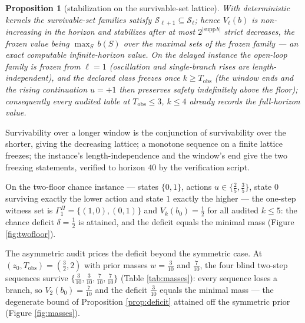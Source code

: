\documentclass[10pt,twocolumn]{article}
\theoremstyle{plain}
\newtheorem{proposition}[theorem]{Proposition}
\theoremstyle{definition}
\theoremstyle{remark}
\begin{document}
\begin{proposition}[stabilization on the survivable-set lattice]\label{prop:freeze}
With deterministic kernels the survivable-set families satisfy
\(\mathcal{S}_{\ell+1} \subseteq \mathcal{S}_{\ell}\); hence
\(V_{\ell}(b)\) is non-increasing in the horizon and stabilizes after
at most \(2^{|\mathrm{supp}\, b|}\) strict decreases, the frozen value
being \(\max_{S}\, b(S)\) over the maximal sets of the frozen family
--- an exact computable infinite-horizon value. On the delayed instance
the open-loop family is frozen from \(\ell = 1\) (oscillation and
single-branch rises are length-independent), and the declared class
freezes once \(k \ge T_{\mathrm{obs}}\) (the window ends and the
rising continuation \(u = +1\) then preserves safety indefinitely
above the floor); consequently every audited table at
\(T_{\mathrm{obs}} \le 3\), \(k \le 4\) already records the
full-horizon value.
\end{proposition}

Survivability over a longer window is the conjunction of survivability
over the shorter, giving the decreasing lattice; a monotone sequence on a
finite lattice freezes; the instance's length-independence and the
window's end give the two freezing statements, verified to horizon
\(40\) by the verification script.

On the two-floor chance instance --- states \(\{0, 1\}\), actions
\(u \in \{\tfrac{2}{5}, \tfrac{3}{5}\}\), state \(0\) surviving exactly
the lower action and state \(1\) exactly the higher --- the one-step
witness set is \(\Gamma^{\Pi}_{1} = \{(1,0), (0,1)\}\) and
\(V_{k}(b_{0}) = \tfrac{1}{2}\) for all audited \(k \le 5\): the chance
deficit \(\delta = \tfrac{1}{2}\) is attained, and the deficit equals the
minimal mass (Figure \ref{fig:twofloor}).

The asymmetric audit prices the deficit beyond the symmetric case. At
\((z_{0}, T_{\mathrm{obs}}) = (\tfrac{3}{2}, 2)\) with prior masses
\(w = \tfrac{3}{10}\) and \(\tfrac{7}{10}\), the four blind two-step
sequences survive
\(\{ \tfrac{3}{10}, \tfrac{3}{10}, \tfrac{7}{10}, \tfrac{7}{10} \}\)
(Table \ref{tab:masses}): every sequence loses a branch, so
\(V_{2}(b_{0}) = \tfrac{7}{10}\) and the deficit \(\tfrac{3}{10}\) equals
the minimal mass --- the degenerate bound of Proposition
\ref{prop:deficit} attained off the symmetric prior (Figure
\ref{fig:masses}).
\end{document}
